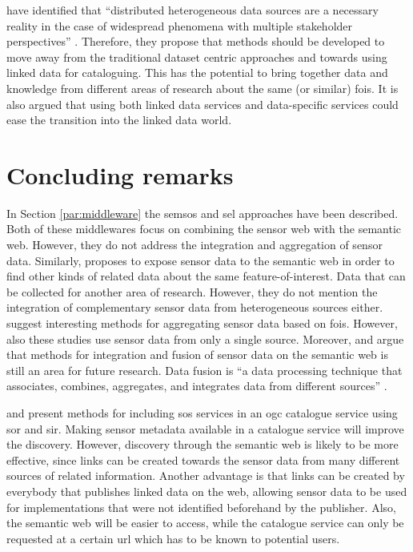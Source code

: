 \cite{SSW:Atkinson} have identified that \enquote{distributed heterogeneous data sources are a necessary reality in the case of widespread phenomena with multiple stakeholder perspectives} \cite[p.129]{SSW:Atkinson}. Therefore, they propose that methods should be developed to move away from the traditional dataset centric approaches and towards using linked data for cataloguing. This has the potential to bring together data and knowledge from different areas of research about the same (or similar) \acp{foi}. It is also argued that using both linked data services and data-specific services could ease the transition into the linked data world.  

\section{Concluding remarks}
\label{par:LDmetadata}
In Section \ref{par:middleware} the \ac{semsos} \citep{SSW:Henson, SSW:Pschorr} and \ac{sel} \citep{SSW:Janowicz} approaches have been described. Both of these middlewares focus on combining the sensor web with the semantic web. However, they do not address the integration and aggregation of sensor data. Similarly, \cite{SSW:Atkinson} proposes to expose sensor data to the semantic web in order to find other kinds of related data about the same feature-of-interest. Data that can be collected for another area of research. However, they do not mention the integration of complementary sensor data from heterogeneous sources either. \citet{SSW:Stasch3,SSW:Stasch} suggest interesting methods for aggregating sensor data based on \acfp{foi}. However, also these studies use sensor data from only a single source. Moreover, \cite{SSW:Corcho} and \cite{SSW:Ji} argue that methods for integration and fusion of sensor data on the semantic web is still an area for future research. Data fusion is \enquote{a data processing technique that associates, combines, aggregates, and integrates data from different sources} \cite[p. 2]{SSW:Wang2}. 

\cite{SW:OGC4} and \cite{SW:OGC3} present methods for including \ac{sos} services in an \ac{ogc} catalogue service using \ac{sor} and \ac{sir}. Making sensor metadata available in a catalogue service will improve the discovery. However, discovery through the semantic web is likely to be more effective, since links can be created towards the sensor data from many different sources of related information. Another advantage is that links can be created by everybody that publishes linked data on the web, allowing sensor data to be used for implementations that were not identified beforehand by the publisher. Also, the semantic web will be easier to access, while the catalogue service can only be requested at a certain \ac{url} which has to be known to potential users. 

